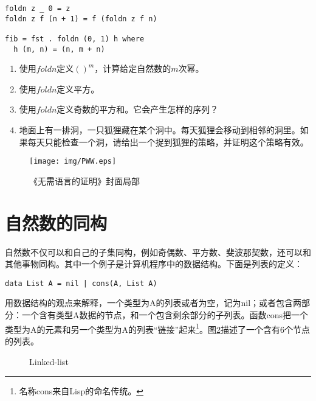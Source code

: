 \documentclass[UTF8]{article}
\begin{document}
\lstset{frame=single}
\begin{lstlisting}
foldn z _ 0 = z
foldn z f (n + 1) = f (foldn z f n)

fib = fst . foldn (0, 1) h where
  h (m, n) = (n, m + n)
\end{lstlisting}

\begin{Exercise}
\begin{enumerate}
\item 使用$foldn$定义$()^m$，计算给定自然数的$m$次幂。
\item 使用$foldn$定义平方。
\item 使用$foldn$定义奇数的平方和。它会产生怎样的序列？
\item 地面上有一排洞，一只狐狸藏在某个洞中。每天狐狸会移动到相邻的洞里。如果每天只能检查一个洞，请给出一个捉到狐狸的策略，并证明这个策略有效\cite{Gusen2014}。
\end{enumerate}
\end{Exercise}

\begin{figure}[htbp]
 \centering
 \texttt{[image: img/PWW.eps]}
 \caption{《无需语言的证明》封面局部}
 \label{fig:PWW}
\end{figure}

\section{自然数的同构}

自然数不仅可以和自己的子集同构，例如奇偶数、平方数、斐波那契数，还可以和其他事物同构。其中一个例子是计算机程序中的数据结构。下面是列表的定义：

\lstset{frame=none}
\begin{lstlisting}
data List A = nil | cons(A, List A)
\end{lstlisting}

用数据结构的观点来解释，一个类型为A的列表或者为空，记为nil；或者包含两部分：一个含有类型A数据的节点，和一个包含剩余部分的子列表。函数cons把一个类型为A的元素和另一个类型为A的列表“链接”起来\footnote{名称cons来自Lisp的命名传统。}。图\ref{fig:linked-list}描述了一个含有6个节点的列表。

\begin{figure}[htbp]
\centering
{}
\caption{Linked-list}
\label{fig:linked-list}
\end{figure}
\end{document}
